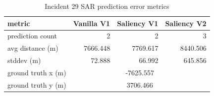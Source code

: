 \begin{table}[ht]
\centering
\caption{Incident 29 SAR prediction error metrics}
\label{tab:sar-incident-29}
\begin{tabular}{lrrr}
\hline
metric & Vanilla V1 & Saliency V1 & Saliency V2 \\
\hline
prediction count & 2 & 2 & 3 \\
avg distance (m) & 7666.448 & 7769.617 & 8440.506 \\
stddev (m) & 72.888 & 66.992 & 645.856 \\
ground truth x (m) & \multicolumn{3}{c}{-7625.557} \\
ground truth y (m) & \multicolumn{3}{c}{3706.466} \\
\hline
\end{tabular}
\end{table}
